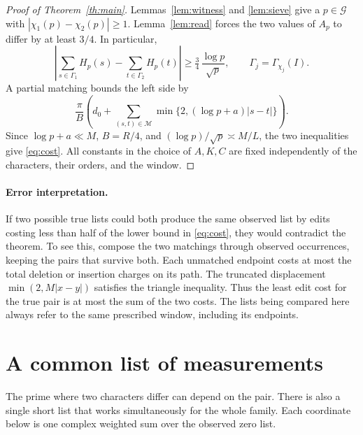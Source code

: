 \documentclass[11pt]{article}
\newcommand{\GG}{\mathcal G}
\begin{document}
\begin{proof}[Proof of Theorem~\ref{th:main}]
Lemmas~\ref{lem:witness} and \ref{lem:sieve} give a $p\in\GG$ with $|\chi_1(p)-\chi_2(p)|\ge1$. Lemma~\ref{lem:read} forces the two values of $A_p$ to differ by at least $3/4$. In particular,
\[
 \left|\sum_{s\in\Gamma_1}H_p(s)-\sum_{t\in\Gamma_2}H_p(t)\right|
 \ge\tfrac34\,\frac{\log p}{\sqrt p},\qquad \Gamma_j=\Gamma_{\chi_j}(I).
\]
A partial matching bounds the left side by
\[
 \frac{\pi}{B}\left(d_0+\sum_{(s,t)\in\mathcal M}
       \min\{2,(\log p+a)|s-t|\}\right).
\]
Since $\log p+a\ll M$, $B=R/4$, and $(\log p)/\sqrt p\asymp M/L$, the two inequalities give \eqref{eq:cost}. All constants in the choice of $A,K,C$ are fixed independently of the characters, their orders, and the window.
\end{proof}

\paragraph{Error interpretation.}
If two possible true lists could both produce the same observed list by edits costing less than half of the lower bound in \eqref{eq:cost}, they would contradict the theorem. To see this, compose the two matchings through observed occurrences, keeping the pairs that survive both. Each unmatched endpoint costs at most the total deletion or insertion charges on its path. The truncated displacement $\min(2,M|x-y|)$ satisfies the triangle inequality. Thus the least edit cost for the true pair is at most the sum of the two costs. The lists being compared here always refer to the same prescribed window, including its endpoints.

\section{A common list of measurements}
The prime where two characters differ can depend on the pair. There is also a single short list that works simultaneously for the whole family. Each coordinate below is one complex weighted sum over the observed zero list.
\end{document}
